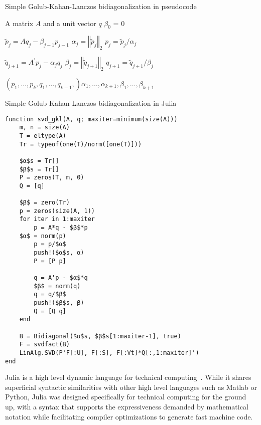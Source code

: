 \documentclass[final,leqno]{siamltex1213}
\begin{document}
\begin{algorithm}
\caption{Simple Golub-Kahan-Lanczos bidiagonalization in pseudocode}

\begin{algorithmic}
\REQUIRE A matrix $A$ and a unit vector $q$
\STATE $\beta_0$ = 0

\STATE $\tilde{p}_j = A q_j - \beta_{j-1} p_{j-1}$
\STATE $\alpha_j = \left\Vert \tilde{p}_j \right\Vert_2$
\STATE $p_j = \tilde{p}_j / \alpha_j$

\STATE $\tilde{q}_{j+1} = A^\prime p_j - \alpha_j q_j$
\STATE $\beta_j = \left\Vert \tilde{q}_{j+1} \right\Vert_2$
\STATE $q_{j+1} = \tilde{q}_{j+1} / \beta_j$

\ENDFOR
\RETURN $\left(p_1, \dots, p_k, q_1, \dots, q_{k+1},\right) \alpha_1, \dots, \alpha_{k+1}, \beta_1, \dots, \beta_{k+1}$
\end{algorithmic}
\end{algorithm}



\begin{algorithm}
\caption{Simple Golub-Kahan-Lanczos bidiagonalization in Julia}

\begin{lstlisting}
function svd_gkl(A, q; maxiter=minimum(size(A)))
    m, n = size(A)
    T = eltype(A)
    Tr = typeof(one(T)/norm([one(T)]))

    $α$s = Tr[]
    $β$s = Tr[]
    P = zeros(T, m, 0)
    Q = [q]

    $β$ = zero(Tr)
    p = zeros(size(A, 1))
    for iter in 1:maxiter
        p = A*q - $β$*p
	$α$ = norm(p)
        p = p/$α$
        push!($α$s, α)
        P = [P p]

        q = A'p - $α$*q
        $β$ = norm(q)
        q = q/$β$
        push!($β$s, β)
        Q = [Q q]
    end

    B = Bidiagonal($α$s, $β$s[1:maxiter-1], true)
    F = svdfact(B)
    LinAlg.SVD(P'F[:U], F[:S], F[:Vt]*Q[:,1:maxiter]')
end
\end{lstlisting}
\end{algorithm}

Julia is a high level dynamic language for technical
computing~\cite{Bezanson2012,Bezanson2015}. While it shares superficial
syntactic similarities with other high level languages such as Matlab or
Python, Julia was designed specifically for technical computing for the ground
up, with a syntax that supports the expressiveness demanded by mathematical
notation while facilitating compiler optimizations to generate fast machine
code.
\end{document}
